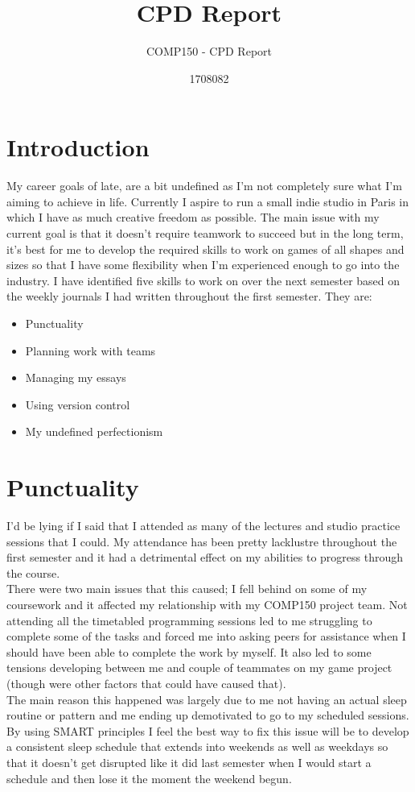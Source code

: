 \documentclass{scrartcl}
\title{CPD Report}
\subtitle{COMP150 - CPD Report}
\author{1708082}
\begin{document}
\maketitle

\section{Introduction}

My career goals of late, are a bit undefined as I'm not completely sure what I'm aiming to achieve in life. Currently I aspire to run a small indie studio in Paris in which I have as much creative freedom as possible. The main issue with my current goal is that it doesn't require teamwork to succeed but in the long term, it's best for me to develop the required skills to work on games of all shapes and sizes so that I have some flexibility when I'm experienced enough to go into the industry. I have identified five skills to work on over the next semester based on the weekly journals I had written throughout the first semester. They are:

\begin{small}
\begin{itemize}
	\item Punctuality
	\item Planning work with teams
	\item Managing my essays
	\item Using version control
	\item My undefined perfectionism
\end{itemize}
\end{small}

\section{Punctuality}

I'd be lying if I said that I attended as many of the lectures and studio practice sessions that I could. My attendance has been pretty lacklustre throughout the first semester and it had a detrimental effect on my abilities to progress through the course.
\\
There were two main issues that this caused; I fell behind on some of my coursework and it affected my relationship with my COMP150 project team. Not attending all the timetabled programming sessions led to me struggling to complete some of the tasks and forced me into asking peers for assistance when I should have been able to complete the work by myself. It also led to some tensions developing between me and couple of teammates on my game project (though were other factors that could have caused that).
\\
The main reason this happened was largely due to me not having an actual sleep routine or pattern and me ending up demotivated to go to my scheduled sessions. By using SMART principles I feel the best way to fix this issue will be to develop a consistent sleep schedule that extends into weekends as well as weekdays so that it doesn't get disrupted like it did last semester when I would start a schedule and then lose it the moment the weekend begun.
\end{document}
